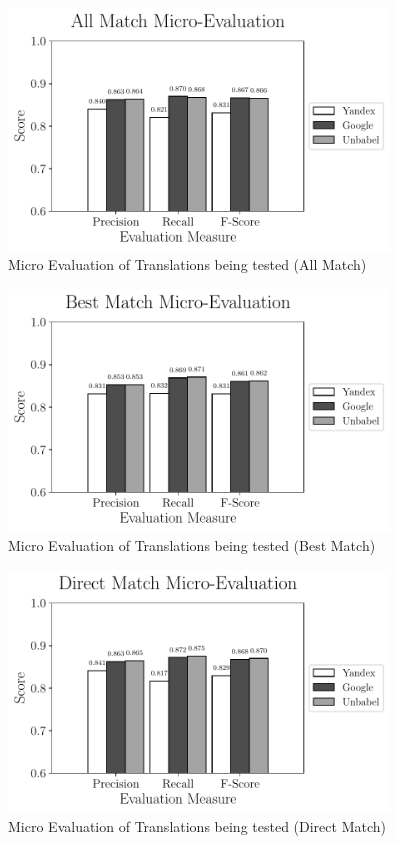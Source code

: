 \begin{figure}
	\centering
	\includegraphics[width=0.9\textwidth]{SupportFiles/plots/all_match_micro_total_plot.pdf}
	\caption{Micro Evaluation of Translations being tested (All Match)}
	\label{fig:micro_eval_all}
\end{figure}

\begin{figure}
	\centering
	\includegraphics[width=0.9\textwidth]{SupportFiles/plots/best_match_micro_total_plot.pdf}
	\caption{Micro Evaluation of Translations being tested (Best Match)}
	\label{fig:micro_eval_best}
\end{figure}

\begin{figure}
	\centering
	\includegraphics[width=0.9\textwidth]{SupportFiles/plots/direct_match_micro_total_plot.pdf}
	\caption{Micro Evaluation of Translations being tested (Direct Match)}
	\label{fig:micro_eval_direct}
\end{figure}



